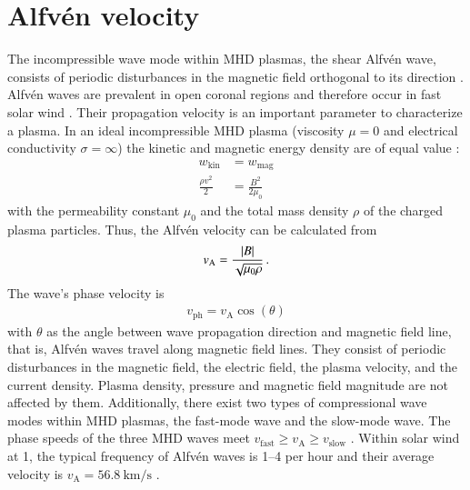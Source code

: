 



\section{Alfvén velocity}
\label{sec:alfvén_velocity}
The incompressible wave mode within MHD plasmas, the shear Alfvén wave, consists of periodic disturbances in the magnetic field orthogonal to its direction \citep{Alfven1942}. Alfvén waves are prevalent in open coronal regions and therefore occur in fast solar wind \citep{Cranmer2005}. Their propagation velocity is an important parameter to characterize a plasma. In an ideal incompressible MHD plasma (viscosity $\mu = 0$ and electrical conductivity $\sigma = \infty$) the kinetic and magnetic energy density are of equal value \citep[p.~51]{Kivelson1995}: 
\begin{align}
	w_\text{kin} &= w_\text{mag}\\
	\frac{\rho v^2}{2} &= \frac{B^2}{2 \mu_0}	\nonumber
\end{align}
with the permeability constant $\mu_0$ and the total mass density $\rho$ of the charged plasma particles. Thus, the Alfvén velocity can be calculated from
\begin{align}
	v_\text{A} = \frac{|B|}{\sqrt{\mu_0 \rho}}	\text{\,.}
\end{align}
The wave's phase velocity is
\begin{align}
	v_\text{ph} = v_\text{A} \cos(\theta)
\end{align}
with $\theta$ as the angle between wave propagation direction and magnetic field line, that is, Alfvén waves travel along magnetic field lines. They consist of periodic disturbances in the magnetic field, the electric field, the plasma velocity, and the current density. Plasma density, pressure and magnetic field magnitude are not affected by them. Additionally, there exist two types of compressional wave modes within MHD plasmas, the fast-mode wave and the slow-mode wave. The phase speeds of the three MHD waves meet $v_\text{fast} \geq v_\text{A} \geq v_\text{slow}$ \citep[p.~52]{Kivelson1995}. Within solar wind at \SI{1}{\au}, the typical frequency of Alfvén waves is 1--4 per hour and their average velocity is $v_\text{A} = \SI{56.8}{\km\per\s}$ \citep{Veselovsky2010}.\\	%

